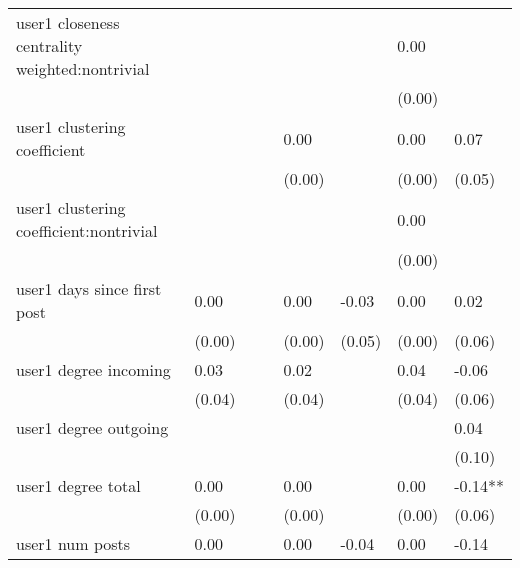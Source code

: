 \begin{table*}
\begin{center}
\begin{tabular}{llllllll}
user1 closeness centrality weighted:nontrivial   &          &            &         &         &          & 0.00               &               \\
                                                 &          &            &         &         &          & (0.00)             &               \\
user1 clustering coefficient                     &          &            &         & 0.00    &          & 0.00               & 0.07          \\
                                                 &          &            &         & (0.00)  &          & (0.00)             & (0.05)        \\
user1 clustering coefficient:nontrivial          &          &            &         &         &          & 0.00               &               \\
                                                 &          &            &         &         &          & (0.00)             &               \\
user1 days since first post                      & 0.00     &            &         & 0.00    & -0.03    & 0.00               & 0.02          \\
                                                 & (0.00)   &            &         & (0.00)  & (0.05)   & (0.00)             & (0.06)        \\
user1 degree incoming                            & 0.03     &            &         & 0.02    &          & 0.04               & -0.06         \\
                                                 & (0.04)   &            &         & (0.04)  &          & (0.04)             & (0.06)        \\
user1 degree outgoing                            &          &            &         &         &          &                    & 0.04          \\
                                                 &          &            &         &         &          &                    & (0.10)        \\
user1 degree total                               & 0.00     &            &         & 0.00    &          & 0.00               & -0.14**       \\
                                                 & (0.00)   &            &         & (0.00)  &          & (0.00)             & (0.06)        \\
user1 num posts                                  & 0.00     &            &         & 0.00    & -0.04    & 0.00               & -0.14         \\

\end{tabular}
\end{center}
\end{table*}
